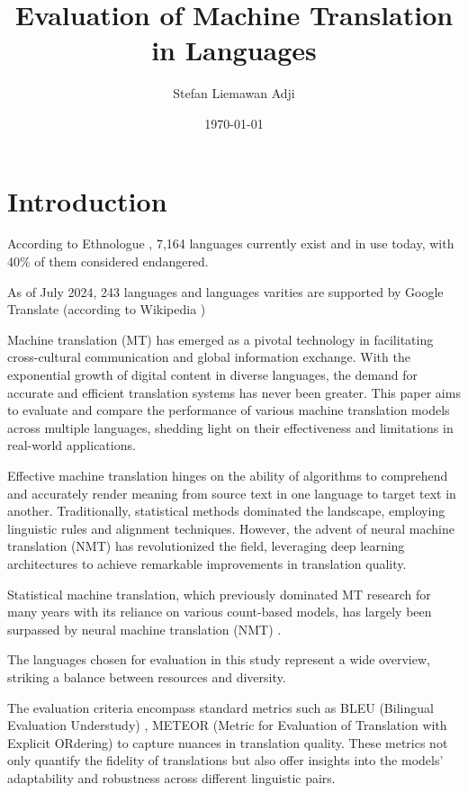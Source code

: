 \documentclass[a4paper]{article}
\title{Evaluation of Machine Translation in Languages}
\author{Stefan Liemawan Adji}
\date{\today}
\begin{document}
\maketitle

\section{Introduction}


According to Ethnologue \cite{ethnologue-2024}, 7,164 languages currently exist and in use today, with 40\% of them considered endangered.

As of July 2024, 243 languages and languages varities are supported by Google Translate (according to Wikipedia \cite{wikipedia-google-translate})

Machine translation (MT) has emerged as a pivotal technology in facilitating cross-cultural communication and global information exchange. With the exponential growth of digital content in diverse languages, the demand for accurate and efficient translation systems has never been greater. This paper aims to evaluate and compare the performance of various machine translation models across multiple languages, shedding light on their effectiveness and limitations in real-world applications.

Effective machine translation hinges on the ability of algorithms to comprehend and accurately render meaning from source text in one language to target text in another. Traditionally, statistical methods dominated the landscape, employing linguistic rules and alignment techniques. However, the advent of neural machine translation (NMT) has revolutionized the field, leveraging deep learning architectures to achieve remarkable improvements in translation quality.

Statistical machine translation, which previously dominated MT research for many years with its reliance on various count-based models, has largely been surpassed by neural machine translation (NMT) \cite{stahlberg-2020-nmt-review}.

The languages chosen for evaluation in this study represent a wide overview, striking a balance between resources and diversity.

The evaluation criteria encompass standard metrics such as BLEU (Bilingual Evaluation Understudy) \cite{papieni-2002-bleu}, METEOR (Metric for Evaluation of Translation with Explicit ORdering) \cite{lavie-2007-meteor} to capture nuances in translation quality. These metrics not only quantify the fidelity of translations but also offer insights into the models' adaptability and robustness across different linguistic pairs.
\end{document}
